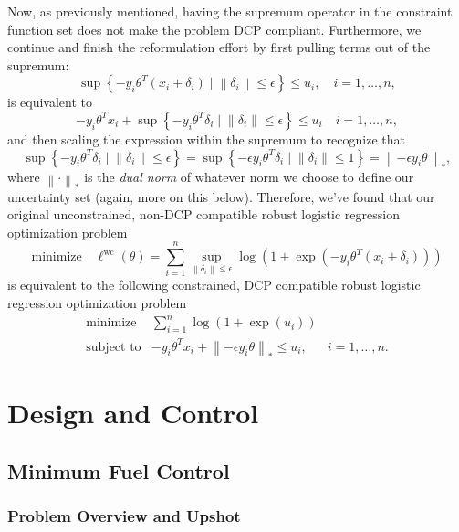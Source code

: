 \documentclass[12pt,reqno]{article}
\theoremstyle{definition}
\numberwithin{equation}{section}
\begin{document}
Now, as previously mentioned, having the supremum operator in the constraint function set does not
make the problem DCP compliant. Furthermore, we continue and finish the reformulation effort by first
pulling terms out of the supremum:
\[\sup \left\{-y_i \theta^T\left(x_i+\delta_i\right) \mid \left\lVert \delta_i \right\rVert \le \epsilon \right\} \le u_i, \quad i = 1, \ldots, n,\]
is equivalent to
\[-y_i\theta^Tx_i + \sup \left\{ -y_i \theta^T \delta_i \mid \left\lVert \delta_i \right\rVert \le \epsilon \right\} \le u_i \quad i = 1, \ldots, n,\]
and then scaling the expression within the supremum
to recognize that 
\[\sup \left\{ -y_i \theta^T \delta_i \mid \left\lVert \delta_i \right\rVert \le \epsilon \right\} = \sup \left\{ -\epsilon y_i \theta^T \delta_i \mid \left\lVert \delta_i \right\rVert \le 1 \right\} = \left\lVert -\epsilon y_i \theta \right\rVert_{*},\]
where $\left\lVert \cdot \right\rVert_{*}$ is the \textit{dual norm} of whatever norm we choose to define our uncertainty set (again, more on this below).
Therefore, we've found that our original unconstrained, non-DCP compatible robust logistic regression optimization problem
\[\mathrm{minimize} \quad \ell^{\mathrm{wc}}(\theta)=\sum_{i=1}^n \sup _{\left\|\delta_i\right\| \leq \epsilon} \log \left(1+\exp \left(-y_i \theta^T\left(x_i+\delta_i\right)\right)\right)\]
is equivalent to the following constrained, DCP compatible robust logistic regression optimization problem
\[\begin{array}{lll}
    \text{minimize} \; & \sum_{i=1}^n \log \left(1+\exp \left(u_i\right)\right) & \\
    \text{subject to} & -y_i\theta^Tx_i + \left\lVert -\epsilon y_i \theta \right\rVert_{*} \le u_i, \; & i = 1, \ldots, n.
    \end{array}\]

\newpage

\section{Design and Control}

\subsection{Minimum Fuel Control}

\subsubsection*{Problem Overview and Upshot}
\end{document}
